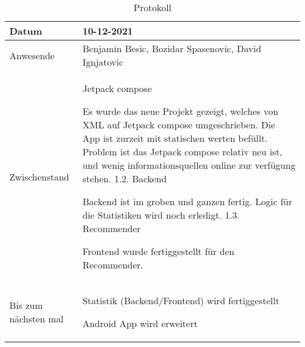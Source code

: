 \begin{table}
    \begin{tabular}{ |p{3cm}|p{10cm}|  }
        \hline
        Datum & 10-12-2021\\
        \hline
        Anwesende & Benjamin Besic, Bozidar Spasenovic, David Ignjatovic\\

        \hline
        Zwischenstand&  Jetpack compose

        Es wurde das neue Projekt gezeigt, welches von XML auf Jetpack compose umgeschrieben.
        Die App ist zurzeit mit statischen werten befüllt.
        Problem ist das Jetpack compose relativ neu ist, und wenig informationsquellen online zur verfügung stehen.
        1.2. Backend
        
        Backend ist im groben und ganzen fertig. Logic für die Statistiken wird noch erledigt.
        1.3. Recommender
        
        Frontend wurde fertiggestellt für den Recommender.
        \\
        \hline
        Bis zum nächsten mal &  



        Statistik (Backend/Frontend) wird fertiggestellt

        Android App wird erweitert
    
    
    
    \\
        \hline
    \end{tabular}
    \caption{Protokoll}
    \label{tab:my_label}
\end{table}
